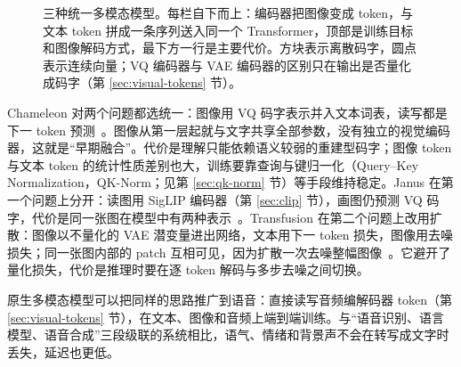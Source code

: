 \begin{figure}[!tb]
\caption{三种统一多模态模型。每栏自下而上：编码器把图像变成 token，与文本 token 拼成一条序列送入同一个 Transformer，顶部是训练目标和图像解码方式，最下方一行是主要代价。方块表示离散码字，圆点表示连续向量；VQ 编码器与 VAE 编码器的区别只在输出是否量化成码字（第 \ref{sec:visual-tokens} 节）。}
\label{fig:unified-routes}
\end{figure}

Chameleon 对两个问题都选统一：图像用 VQ 码字表示并入文本词表，读写都是下一 token 预测~\cite{chameleon2024}。图像从第一层起就与文字共享全部参数，没有独立的视觉编码器，这就是“早期融合”。代价是理解只能依赖语义较弱的重建型码字；图像 token 与文本 token 的统计性质差别也大，训练要靠查询与键归一化（Query--Key Normalization，QK-Norm；见第 \ref{sec:qk-norm} 节）等手段维持稳定。Janus 在第一个问题上分开：读图用 SigLIP 编码器（第 \ref{sec:clip} 节），画图仍预测 VQ 码字，代价是同一张图在模型中有两种表示~\cite{wu2024janus}。Transfusion 在第二个问题上改用扩散：图像以不量化的 VAE 潜变量进出网络，文本用下一 token 损失，图像用去噪损失；同一张图内部的 patch 互相可见，因为扩散一次去噪整幅图像~\cite{zhou2024transfusion}。它避开了量化损失，代价是推理时要在逐 token 解码与多步去噪之间切换。

原生多模态模型可以把同样的思路推广到语音：直接读写音频编解码器 token（第 \ref{sec:visual-tokens} 节），在文本、图像和音频上端到端训练。与“语音识别、语言模型、语音合成”三段级联的系统相比，语气、情绪和背景声不会在转写成文字时丢失，延迟也更低。
